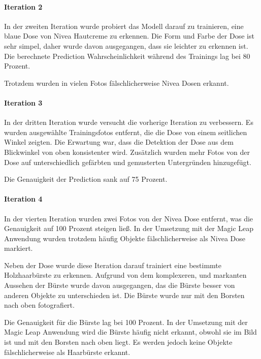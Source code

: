 \paragraph{Iteration 2}

In der zweiten Iteration wurde probiert das Modell darauf zu trainieren, eine blaue Dose von Nivea Hautcreme zu erkennen. Die Form und Farbe der Dose ist sehr simpel, daher wurde davon ausgegangen, dass sie leichter zu erkennen ist. Die berechnete Prediction Wahrscheinlichkeit während des Trainings lag bei 80 Prozent.

Trotzdem wurden in vielen Fotos fälschlicherweise Nivea Dosen erkannt. 

\paragraph{Iteration 3}

In der dritten Iteration wurde versucht die vorherige Iteration zu verbessern. Es wurden ausgewählte Trainingsfotos entfernt, die die Dose von einem seitlichen Winkel zeigten. Die Erwartung war, dass die Detektion der Dose aus dem Blickwinkel von oben konsistenter wird. Zusätzlich wurden mehr Fotos von der Dose auf unterschiedlich gefärbten und gemusterten Untergründen hinzugefügt. 

Die Genauigkeit der Prediction sank auf 75 Prozent.

\paragraph{Iteration 4}

In der vierten Iteration wurden zwei Fotos von der Nivea Dose entfernt, was die Genauigkeit auf 100 Prozent steigen ließ. In der Umsetzung mit der Magic Leap Anwendung wurden trotzdem häufig Objekte fälschlicherweise als Nivea Dose markiert.

Neben der Dose wurde diese Iteration darauf trainiert eine bestimmte Holzhaarbürste zu erkennen. Aufgrund von dem komplexeren, und markanten Aussehen der Bürste wurde davon ausgegangen, das die Bürste besser von anderen Objekte zu unterschieden ist. 
Die Bürste wurde nur mit den Borsten nach oben fotografiert.

Die Genauigkeit für die Bürste lag bei 100 Prozent. 
In der Umsetzung mit der Magic Leap Anwendung wird die Bürste häufig nicht erkannt, obwohl sie im Bild ist und mit den Borsten nach oben liegt. Es werden jedoch keine Objekte fälschlicherweise als Haarbürste erkannt.

